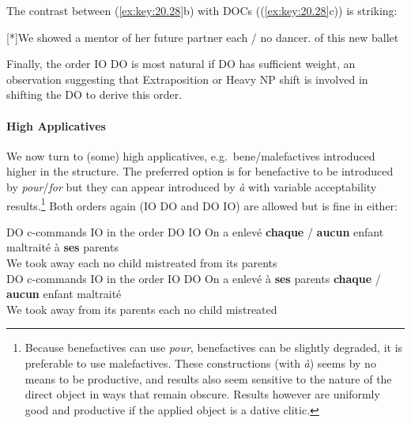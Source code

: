 \documentclass[output=paper]{langsci/langscibook}
\begin{document}
The contrast between  (\ref{ex:key:20.28}b) with 
\glspl{DOC} ((\ref{ex:key:20.28}c)) is striking:

\begin{exe}
    \exi{\eqref{ex:key:20.28}}
    \begin{xlist}
    [*]{We {} showed  a mentor of her future partner each / no dancer.\glossF{} of this new ballet}
    \end{xlist}
\end{exe}

Finally, the order IO DO is most natural if DO has sufficient weight, an
observation suggesting that Extraposition or Heavy NP shift is involved in
shifting the DO to derive this order.

\paragraph*{High Applicatives} We now turn to (some) high applicatives, e.g.\
bene/male\-factives introduced higher in the structure. The preferred option is
for benefactive to be introduced by \emph{pour}/\emph{for} but they can appear
introduced by \emph{à} with variable acceptability results.\footnote{Because
    benefactives can use {\it pour}, benefactives can be slightly degraded, it
    is preferable to use malefactives. These constructions (with \emph{à})
    seems by no means to be productive, and results also seem sensitive to the
nature of the direct object in ways that remain obscure. Results however are
uniformly good and productive if the applied object is a dative clitic.} Both
orders again (IO DO and DO IO) are allowed but \isi{binding} is fine in either:

\ea \label{doio25}
\ea  DO c-commands IO in the order DO IO
\sn
\gll On a  enlev\'{e} \textbf{chaque} / \textbf{aucun} enfant maltrait\'e \`{a} {\bf ses} parents\\
We {} {took away} each {} no child mistreated from its parents\\
\ex  DO c-commands IO in the order IO DO
\sn
\gll On a  enlev\'{e} \`{a} {\bf ses} parents \textbf{chaque} / \textbf{aucun} enfant maltrait\'e \\
We {} {took away}  from its parents each {} no child mistreated\\
\z
\z
\end{document}
